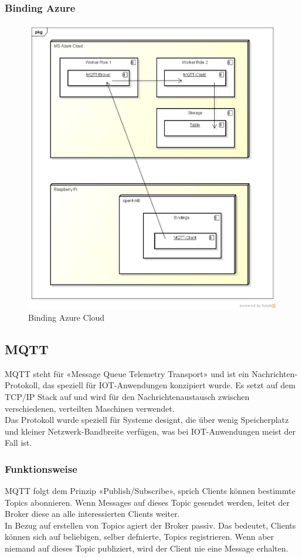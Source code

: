 \subsubsection{Binding Azure}
\begin{figure}[h!]
	\centering
		\includegraphics[scale=0.5]{report/img/deployment_binding_azure}
	\caption{Binding Azure Cloud}
	\label{fig:deploymentAzure}
\end{figure}

\subsection{MQTT}
MQTT steht für «Message Queue Telemetry Transport» und ist ein Nachrichten-Protokoll, das speziell für IOT-Anwendungen konzipiert wurde. Es setzt auf dem TCP/IP Stack auf und wird für den Nachrichtenaustausch zwischen verschiedenen, verteilten Maschinen verwendet. \\
Das Protokoll wurde speziell für Systeme designt, die über wenig Speicherplatz und kleiner Netzwerk-Bandbreite verfügen, was bei IOT-Anwendungen meist der Fall ist.

\subsubsection{Funktionsweise}
MQTT folgt dem Prinzip «Publish/Subscribe», sprich Clients können bestimmte Topics abonnieren. Wenn Messages auf dieses Topic gesendet werden, leitet der Broker diese an alle interessierten Clients weiter. \\
In Bezug auf erstellen von Topics agiert der Broker passiv. Das bedeutet, Clients können sich auf beliebigen, selber defnierte, Topics registrieren. Wenn aber niemand auf dieses Topic publiziert, wird der Client nie eine Message erhalten.


